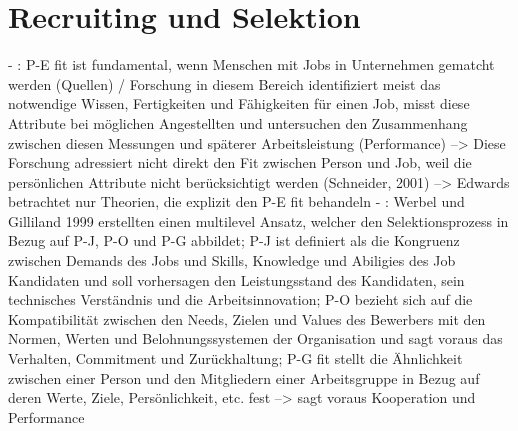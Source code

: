 \section{Recruiting und Selektion}
\label{ch:notizen:rekcruitingUndSelektion}
- \cite[S. 33]{edwards:2008}: P-E fit ist fundamental, wenn Menschen mit Jobs in Unternehmen gematcht werden (Quellen) / Forschung in diesem Bereich identifiziert meist das notwendige Wissen, Fertigkeiten und Fähigkeiten für einen Job, misst diese Attribute bei möglichen Angestellten und untersuchen den Zusammenhang zwischen diesen Messungen und späterer Arbeitsleistung (Performance) --> Diese Forschung adressiert nicht direkt den Fit zwischen Person und Job, weil die persönlichen Attribute nicht berücksichtigt werden (Schneider, 2001) --> Edwards betrachtet nur Theorien, die explizit den P-E fit behandeln
- \cite[S. 5]{su:2015}: Werbel und Gilliland 1999 erstellten einen multilevel Ansatz, welcher den Selektionsprozess in Bezug auf P-J, P-O und P-G abbildet; P-J ist definiert als die Kongruenz zwischen Demands des Jobs und Skills, Knowledge und Abiligies des Job Kandidaten und soll vorhersagen den Leistungsstand des Kandidaten, sein technisches Verständnis und die Arbeitsinnovation; P-O bezieht sich auf die Kompatibilität zwischen den Needs, Zielen und Values des Bewerbers mit den Normen, Werten und Belohnungssystemen der Organisation und sagt voraus das Verhalten, Commitment und Zurückhaltung; P-G fit stellt die Ähnlichkeit zwischen einer Person und den Mitgliedern einer Arbeitsgruppe in Bezug auf deren Werte, Ziele, Persönlichkeit, etc. fest --> sagt voraus Kooperation und Performance \\


